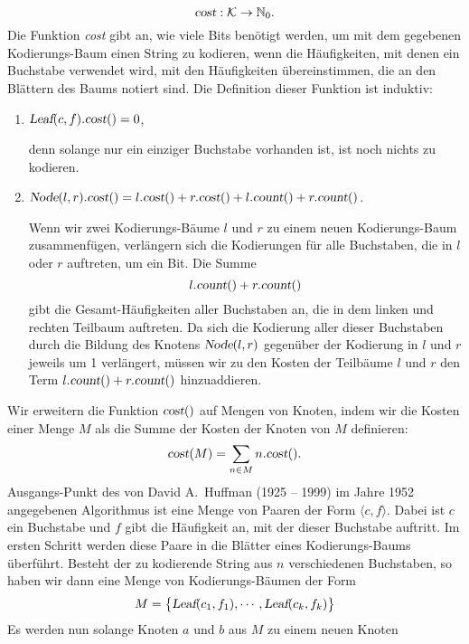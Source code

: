 \[ \textsl{cost}: \mathcal{K} \rightarrow {\mathbb N}_0. \]
Die Funktion \textsl{cost} gibt an, wie viele Bits ben\"otigt werden, um mit dem gegebenen
Kodierungs-Baum einen String zu kodieren, wenn die H\"aufigkeiten, mit denen ein Buchstabe
verwendet wird, mit den H\"aufigkeiten \"ubereinstimmen, die an den Bl\"attern des Baums notiert
sind.  Die Definition dieser Funktion ist induktiv:
\begin{enumerate}
\item $\textsl{Leaf}(c,f).\textsl{cost}() = 0$,

      denn solange nur ein einziger Buchstabe vorhanden ist, ist noch nichts zu kodieren.
\item $\textsl{Node}(l,r).\textsl{cost}() = 
       l.\textsl{cost}() + r.\textsl{cost}() + l.\textsl{count}() + r.\textsl{count}()$.

      Wenn wir zwei Kodierungs-B\"aume $l$ und $r$ zu einem neuen Kodierungs-Baum
      zusammenf\"ugen, verl\"angern sich die Kodierungen f\"ur alle Buchstaben, die in $l$ oder
      $r$ auftreten, um ein Bit.
      Die Summe 
      \[ l.\textsl{count}() + r.\textsl{count}() \]
      gibt die Gesamt-H\"aufigkeiten aller Buchstaben an, die in dem linken und
      rechten Teilbaum auftreten.  Da sich die Kodierung aller dieser Buchstaben
      durch die Bildung des Knotens $\textsl{Node}(l,r)$ gegen\"uber der Kodierung in $l$
      und $r$ jeweils um 1 verl\"angert, m\"ussen wir zu den Kosten der Teilb\"aume $l$ und $r$
      den Term $l.\textsl{count}() + r.\textsl{count}()$ hinzuaddieren.
\end{enumerate}
Wir erweitern die Funktion $\textsl{cost}()$ auf Mengen von Knoten, indem wir die Kosten
einer Menge $M$ als die Summe der Kosten der Knoten von $M$ definieren:
\[ \textsl{cost}(M) = \sum\limits_{n\in M} n.\textsl{cost}(). \]
Ausgangs-Punkt des von David A.~Huffman (1925 -- 1999) im Jahre 1952 angegebenen
Algorithmus \cite{huffman:52} ist eine Menge von Paaren der Form $\langle c, f\rangle$.  Dabei ist
$c$ ein 
Buchstabe und $f$ gibt die H\"aufigkeit an, mit der dieser Buchstabe auftritt.  Im ersten
Schritt werden diese Paare in die Bl\"atter eines Kodierungs-Baums \"uberf\"uhrt.  Besteht der
zu kodierende String aus  $n$ verschiedenen Buchstaben, so haben
wir dann eine Menge von Kodierungs-B\"aumen der Form
\begin{equation}
  \label{eq:huffmann1}
 M = \bigl\{  \textsl{Leaf}(c_1, f_1), \cdots, \textsl{Leaf}(c_k, f_k) \bigr\}   
\end{equation}
Es werden nun solange Knoten $a$ und $b$ aus $M$ zu einem neuen Knoten

